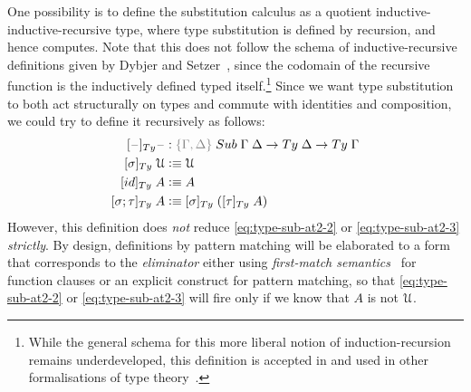 \documentclass[a4paper,UKenglish,numberwithinsect,cleveref,thm-restate]{lipics-v2021}
\begin{document}
One possibility is to define the substitution calculus as a quotient inductive-inductive-recursive type, where type substitution is defined by recursion, and hence computes.
Note that this does not follow the schema of inductive-recursive definitions given by Dybjer and Setzer~\cite{Dybjer2000,Dybjer2003}, since the codomain of the recursive function is the inductively defined typed itself.\footnote{%
  While the general schema for this more liberal notion of induction-recursion remains underdeveloped, this definition is accepted in \Agda and used in other formalisations of type theory~\cite{Danielsson2006}.}
%
Since we want type substitution to both act structurally on types and commute with identities and composition, we could try to define it recursively as follows:
\begin{alignat}{3}
[\blank]_{\Ty} \blank &: \implicit{\Gamma, \Delta} \; \Sub\;\Gamma\;\Delta \to \Ty\;\Delta \to \Ty\;\Gamma \nonumber \\
[ \sigma ]_{\Ty}       \;\UU  & \defeq \UU                                   \label{eq:type-sub-at2-1} \\
[ \idS ]_{\Ty}         \;A    & \defeq A                                     \label{eq:type-sub-at2-2} \\
[ \sigma ; \tau ]_{\Ty}\;A    & \defeq [ \sigma ]_{\Ty}\;([ \tau ]_{\Ty}\;A) \label{eq:type-sub-at2-3}
\end{alignat}
However, this definition does \emph{not} reduce \eqref{eq:type-sub-at2-2} or \eqref{eq:type-sub-at2-3} \emph{strictly}.
By design, definitions by pattern matching will be elaborated to a form that corresponds to the \emph{eliminator} either using \emph{first-match semantics}~\cite{Cockx2020a} for function clauses or an explicit construct for pattern matching, so that \eqref{eq:type-sub-at2-2} or \eqref{eq:type-sub-at2-3} will fire only if we know that $A$ is not $\mathcal{U}$.
\end{document}

